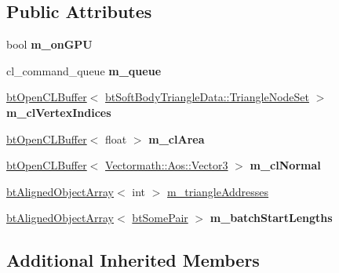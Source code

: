 \subsection*{Public Attributes}
\begin{DoxyCompactItemize}
\item 
\mbox{\label{classbtSoftBodyTriangleDataOpenCL_a5e979f70bc19df87c3adec0ef24b7335}} 
bool {\bfseries m\+\_\+on\+G\+PU}
\item 
\mbox{\label{classbtSoftBodyTriangleDataOpenCL_abaf3e4b2e9d50aff1ee54ba69b15eef0}} 
cl\+\_\+command\+\_\+queue {\bfseries m\+\_\+queue}
\item 
\mbox{\label{classbtSoftBodyTriangleDataOpenCL_af8e3c9fa945ccf501f09c22583bcdb50}} 
\hyperlink{classbtOpenCLBuffer}{bt\+Open\+C\+L\+Buffer}$<$ \hyperlink{classbtSoftBodyTriangleData_1_1TriangleNodeSet}{bt\+Soft\+Body\+Triangle\+Data\+::\+Triangle\+Node\+Set} $>$ {\bfseries m\+\_\+cl\+Vertex\+Indices}
\item 
\mbox{\label{classbtSoftBodyTriangleDataOpenCL_a15488d0b1b6697aaf9718533420bcb2e}} 
\hyperlink{classbtOpenCLBuffer}{bt\+Open\+C\+L\+Buffer}$<$ float $>$ {\bfseries m\+\_\+cl\+Area}
\item 
\mbox{\label{classbtSoftBodyTriangleDataOpenCL_a75ae81ffa3d4debc0eaf42ed481e1257}} 
\hyperlink{classbtOpenCLBuffer}{bt\+Open\+C\+L\+Buffer}$<$ \hyperlink{classVectormath_1_1Aos_1_1Vector3}{Vectormath\+::\+Aos\+::\+Vector3} $>$ {\bfseries m\+\_\+cl\+Normal}
\item 
\hyperlink{classbtAlignedObjectArray}{bt\+Aligned\+Object\+Array}$<$ int $>$ \hyperlink{classbtSoftBodyTriangleDataOpenCL_a7b0d241380b3cbfbd7c386b354a268fd}{m\+\_\+triangle\+Addresses}
\item 
\mbox{\label{classbtSoftBodyTriangleDataOpenCL_ae286924092679bd420f09a99456507ae}} 
\hyperlink{classbtAlignedObjectArray}{bt\+Aligned\+Object\+Array}$<$ \hyperlink{structbtSoftBodyTriangleDataOpenCL_1_1btSomePair}{bt\+Some\+Pair} $>$ {\bfseries m\+\_\+batch\+Start\+Lengths}
\end{DoxyCompactItemize}
\subsection*{Additional Inherited Members}


